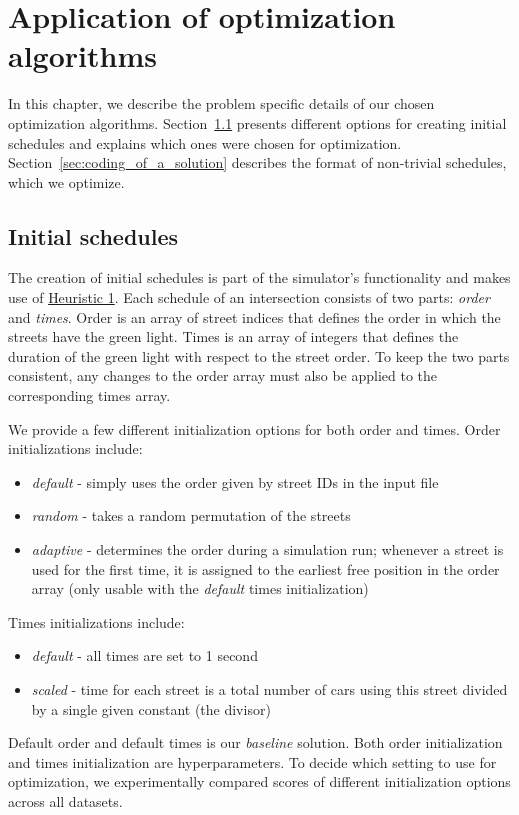 \chapter{Application of optimization algorithms}

In this chapter, we describe the problem specific details of our chosen optimization algorithms. Section~\ref{sec:initial_schedules} presents different options for creating initial schedules and explains which ones were chosen for optimization. Section~\ref{sec:coding_of_a_solution} describes the format of non-trivial schedules, which we optimize. 

\section{Initial schedules} \label{sec:initial_schedules}

The creation of initial schedules is part of the simulator's functionality and makes use of \hyperref[para:heuristic_1]{Heuristic 1}.
Each schedule of an intersection consists of two parts: \textit{order} and \textit{times}. Order is an array of street indices that defines the order in which the streets have the green light. Times is an array of integers that defines the duration of the green light with respect to the street order. To keep the two parts consistent, any changes to the order array must also be applied to the corresponding times array.

We provide a few different initialization options for both order and times. Order initializations include:
\begin{itemize}
    \item \textit{default} - simply uses the order given by street IDs in the input file
    \item \textit{random} - takes a random permutation of the streets
    \item \textit{adaptive} - determines the order during a simulation run; whenever a street is used for the first time, it is assigned to the earliest free position in the order array (only usable with the \textit{default} times initialization)
\end{itemize}
Times initializations include:
\begin{itemize}
    \item \textit{default} - all times are set to 1 second
    \item \textit{scaled} - time for each street is a total number of cars using this street divided by a single given constant (the divisor)
\end{itemize}
Default order and default times is our \textit{baseline} solution.
Both order initialization and times initialization are hyperparameters. To decide which setting to use for optimization, we experimentally compared scores of different initialization options across all datasets.

